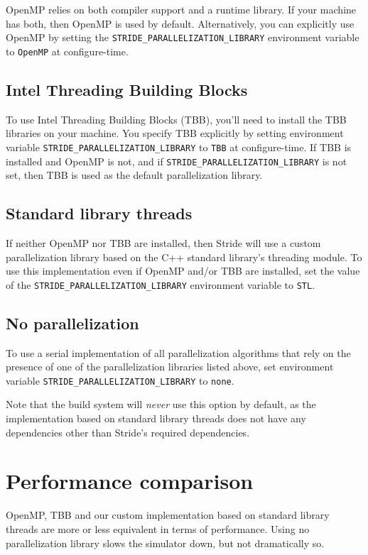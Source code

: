 OpenMP relies on both compiler support and a runtime library. If your machine has both, then OpenMP is used by default. Alternatively, you can explicitly use OpenMP by setting the \texttt{STRIDE\_PARALLELIZATION\_LIBRARY} environment variable to \texttt{OpenMP} at configure-time.

\subsection{Intel Threading Building Blocks}

To use Intel Threading Building Blocks (TBB), you'll need to install the TBB libraries on your machine. You specify TBB explicitly by setting environment variable \texttt{STRIDE\_PARALLELIZATION\_LIBRARY} to \texttt{TBB} at configure-time. If TBB is installed and OpenMP is not, and if \texttt{STRIDE\_PARALLELIZATION\_LIBRARY} is not set, then TBB is used as the default parallelization library.

\subsection{Standard library threads}

If neither OpenMP nor TBB are installed, then Stride will use a custom parallelization library based on the C++ standard library's threading module. To use this implementation even if OpenMP and/or TBB are installed, set the value of the \texttt{STRIDE\_PARALLELIZATION\_LIBRARY} environment variable to \texttt{STL}.

\subsection{No parallelization}

To use a serial implementation of all parallelization algorithms that rely on the presence of one of the parallelization libraries listed above, set environment variable \texttt{STRIDE\_PARALLELIZATION\_LIBRARY} to \texttt{none}.

Note that the build system will \emph{never} use this option by default, as the implementation based on standard library threads does not have any dependencies other than Stride's required dependencies.

\section{Performance comparison}

OpenMP, TBB and our custom implementation based on standard library threads are more or less equivalent in terms of performance. Using no parallelization library slows the simulator down, but not dramatically so.

